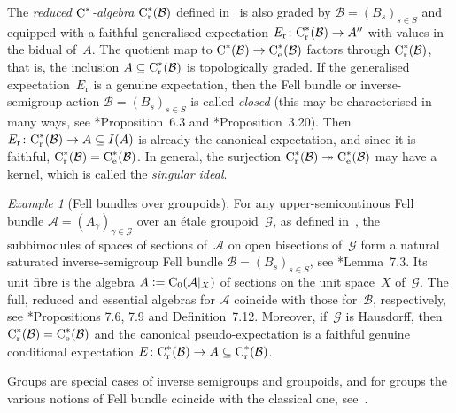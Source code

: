 \documentclass[a4paper]{amsart}
\theoremstyle{plain}
\theoremstyle{definition}
\theoremstyle{remark}
\newtheorem{example}[theorem]{Example}
\numberwithin{theorem}{section}
\numberwithin{equation}{section}
\newcommand*{\nb}{\nobreakdash}
\newcommand*{\red}{\mathrm{r}}%
\newcommand*{\ess}{\mathrm{e}}%
\newcommand*{\Cst}{\textup C^*}%
\newcommand*{\Cont}{\textup C}%
\newcommand*{\B}{\mathcal B}%
\newcommand*{\A}{\mathcal A}%
\newcommand*{\defeq}{\mathrel{\vcentcolon=}}%
\newcommand*{\Gr}{\mathcal{G}}%
\newcommand*{\onto}{\twoheadrightarrow}
\begin{document}
The \emph{reduced \(\Cst\)\nb-algebra} \(\Cst_\red(\B)\) defined
in~\cite{Buss-Exel-Meyer:Reduced} is also graded by \(\B=(B_s)_{s\in
  S}\) and equipped with a faithful generalised expectation
\(E_\red\colon\Cst_\red(\B)\to A''\) with values in the bidual
of~\(A\).
The quotient map to \(\Cst(\B) \to \Cst_\ess(\B)\) factors through
\(\Cst_\red(\B)\), that is, the inclusion \(A\subseteq \Cst_\red(\B)\)
is topologically graded.
If the generalised expectation~\(E_\red\) is a genuine expectation,
then the Fell bundle or inverse-semigroup action \(\B=(B_s)_{s\in S}\)
is called \emph{closed}
(this may be characterised in many ways, see
\cite{Buss-Exel-Meyer:Reduced}*{Proposition~6.3} and
\cite{Kwasniewski-Meyer:Essential}*{Proposition~3.20}).
Then \(E_\red\colon\Cst_\red(\B)\to A\subseteq I(A)\) is already the
canonical expectation, and since it is faithful,
\(\Cst_\red(\B)=\Cst_\ess(\B)\).
In general, the surjection \(\Cst_\red(\B)\onto \Cst_\ess(\B)\) may
have a kernel, which is called the \emph{singular ideal}.

\begin{example}[Fell bundles over groupoids]
  For any upper-semicontinous Fell bundle \(\A=(A_\gamma)_{\gamma\in
    \Gr}\) over an \'etale groupoid~\(\Gr\), as defined
  in~\cite{BussExel:Fell.Bundle.and.Twisted.Groupoids}, the
  subbimodules of spaces of sections of~\(\A\) on open bisections
  of~\(\Gr\) form a natural saturated inverse-semigroup Fell bundle
  \(\B=(B_s)_{s\in S}\), see
  \cite{Kwasniewski-Meyer:Essential}*{Lemma~7.3}.
  Its unit fibre is the algebra \(A\defeq\Cont_0(\A|_X)\) of sections
  on the unit space~\(X\) of~\(\Gr\).
  The full, reduced and essential algebras for \(\A\) coincide with
  those for~\(\B\), respectively, see
  \cite{Kwasniewski-Meyer:Essential}*{Propositions 7.6, 7.9 and
    Definition~7.12}.
  Moreover, if~\(\Gr\) is Hausdorff, then \(\Cst_\red(\B) =
  \Cst_\ess(\B)\) and the canonical pseudo-expectation is a faithful
  genuine conditional expectation \(E\colon \Cst_\red(\B)\to
  A\subseteq \Cst_\red(\B)\).
\end{example}

Groups are special cases of inverse semigroups and groupoids, and for
groups the various notions of Fell bundle coincide with the classical
one, see~\cite{Exel:Partial_dynamical}.
\end{document}
